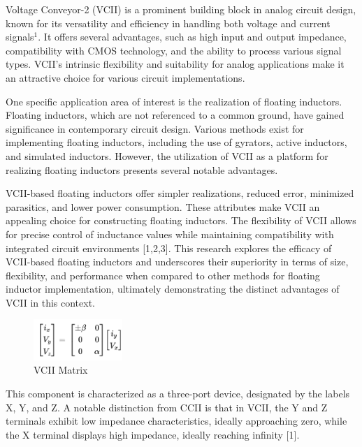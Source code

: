 \documentclass{./styles/svproc}
\begin{document}
Voltage Conveyor-2 (VCII) is a prominent building block in analog circuit design, known for its versatility and efficiency in handling both voltage and current signals$^1$. It offers several advantages, 
such as high input and output impedance, compatibility with CMOS technology, and the ability to process various signal types. 
VCII's intrinsic flexibility and suitability for analog applications make it an attractive choice for various circuit implementations.

One specific application area of interest is the realization of floating inductors. Floating inductors, which are not referenced to a common ground, have gained significance in contemporary circuit design. Various methods exist for implementing floating inductors, including the use of gyrators, active inductors, and simulated inductors. However, the utilization of VCII as a platform for realizing floating inductors presents several notable advantages.

VCII-based floating inductors offer simpler realizations, reduced error, minimized parasitics, and lower power consumption. These attributes make VCII an appealing choice for constructing floating inductors. The flexibility of VCII allows for precise control of inductance values while maintaining compatibility with integrated circuit environments [1,2,3]. This research explores the efficacy of VCII-based floating inductors and underscores their superiority in terms of size, flexibility, and performance when compared to other methods for floating inductor implementation, ultimately demonstrating the distinct advantages of VCII in this context.


\begin{figure}[h]
\begin{center}
    \includegraphics[width=0.3\textwidth]{templates/vc2matrix.png}
    \caption{VCII Matrix}
    \vspace{0.5cm}
  \end{center}
\end{figure}

 This component is characterized as a three-port device, designated by the labels X, Y, and Z. A notable 
distinction from CCII is that in VCII, the Y and Z terminals exhibit low impedance 
characteristics, ideally approaching zero, while the X terminal displays high impedance, 
ideally reaching infinity [1]. 
 
\end{document}
